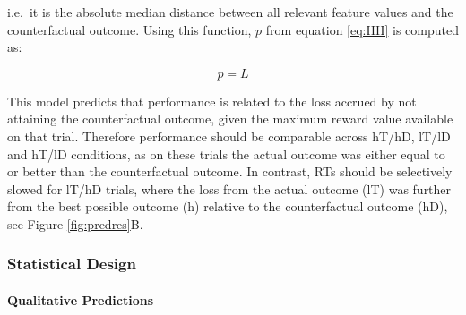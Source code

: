 \documentclass[11pt,halfline,a4paper,]{ouparticle}
\begin{document}
i.e.~it is the absolute median distance between all relevant feature values and the counterfactual outcome. Using this function, \(p\) from equation \ref{eq:HH} is computed as:

\begin{equation}\label{eq:countloss}
  p = L
\end{equation}

This model predicts that performance is related to the loss accrued by not attaining the counterfactual outcome, given the maximum reward value available on that trial. Therefore performance should be comparable across hT/hD, lT/lD and hT/lD conditions, as on these trials the actual outcome was either equal to or better than the counterfactual outcome. In contrast, RTs should be selectively slowed for lT/hD trials, where the loss from the actual outcome (lT) was further from the best possible outcome (h) relative to the counterfactual outcome (hD), see Figure \ref{fig:predres}B.

\hypertarget{statistical-design}{%
\subsubsection{Statistical Design}\label{statistical-design}}

\label{sec:Stats}

\hypertarget{qualitative-predictions}{%
\paragraph{Qualitative Predictions}\label{qualitative-predictions}}
\end{document}
